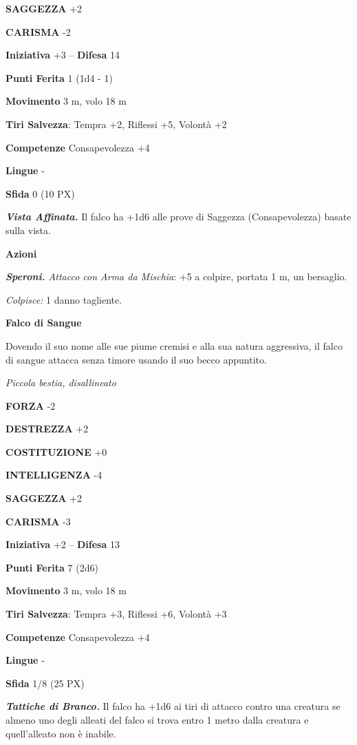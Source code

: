 \begin{multicols}{2}
	\textbf{SAGGEZZA} +2

	\textbf{CARISMA} -2

	\textbf{Iniziativa} +3 -- \textbf{Difesa} 14

	\textbf{Punti Ferita} 1 (1d4 - 1)

	\textbf{Movimento} 3 m, volo 18 m

	\textbf{Tiri Salvezza}: Tempra +2, Riflessi +5, Volontà +2

	\textbf{Competenze} Consapevolezza +4

	\textbf{Lingue} -

	\textbf{Sfida} 0 (10 PX)

	\textit{\textbf{Vista Affinata.}} Il falco ha +1d6 alle prove di Saggezza (Consapevolezza) basate sulla vista.

	\textbf{Azioni}

	\textit{\textbf{Speroni.} Attacco con Arma da Mischia}: +5 a colpire, portata 1 m, un bersaglio.

	\textit{Colpisce:} 1 danno tagliente.

	\medskip\textbf{Falco di Sangue}

	Dovendo il suo nome alle sue piume cremisi e alla sua natura aggressiva, il falco di sangue attacca senza timore usando il suo becco appuntito.

	\textit{Piccola bestia, disallineato}

	\textbf{FORZA} -2

	\textbf{DESTREZZA} +2

	\textbf{COSTITUZIONE} +0

	\textbf{INTELLIGENZA} -4

	\textbf{SAGGEZZA} +2

	\textbf{CARISMA} -3

	\textbf{Iniziativa} +2 -- \textbf{Difesa} 13

	\textbf{Punti Ferita} 7 (2d6)

	\textbf{Movimento} 3 m, volo 18 m

	\textbf{Tiri Salvezza}: Tempra +3, Riflessi +6, Volontà +3

	\textbf{Competenze} Consapevolezza +4

	\textbf{Lingue} -

	\textbf{Sfida} 1/8 (25 PX)

	\textit{\textbf{Tattiche di Branco.}} Il falco ha +1d6 ai tiri di attacco contro una creatura se almeno uno degli alleati del falco si trova entro 1 metro dalla creatura e quell'alleato non è inabile.


\end{multicols}
